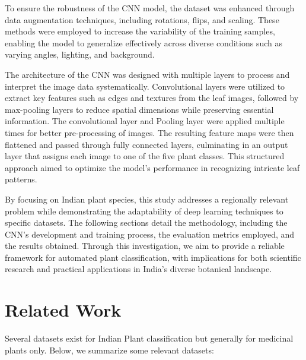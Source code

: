 \documentclass[twocolumn]{article}
\begin{document}
To ensure the robustness of the CNN model, the dataset was enhanced through data augmentation techniques, including rotations, flips, and scaling. These methods were employed to increase the variability of the training samples, enabling the model to generalize effectively across diverse conditions such as varying angles, lighting, and background.

The architecture of the CNN was designed with multiple layers to process and interpret the image data systematically. Convolutional layers were utilized to extract key features such as edges and textures from the leaf images, followed by max-pooling layers to reduce spatial dimensions while preserving essential information. The convolutional layer and Pooling layer were applied multiple times for better pre-processing of images. The resulting feature maps were then flattened and passed through fully connected layers, culminating in an output layer that assigns each image to one of the five plant classes. This structured approach aimed to optimize the model's performance in recognizing intricate leaf patterns.

By focusing on Indian plant species, this study addresses a regionally relevant problem while demonstrating the adaptability of deep learning techniques to specific datasets. The following sections detail the methodology, including the CNN's development and training process, the evaluation metrics employed, and the results obtained. Through this investigation, we aim to provide a reliable framework for automated plant classification, with implications for both scientific research and practical applications in India's diverse botanical landscape.

\section{Related Work}
Several datasets exist for Indian Plant classification but generally for medicinal plants only. Below, we summarize some relevant datasets:
\end{document}
